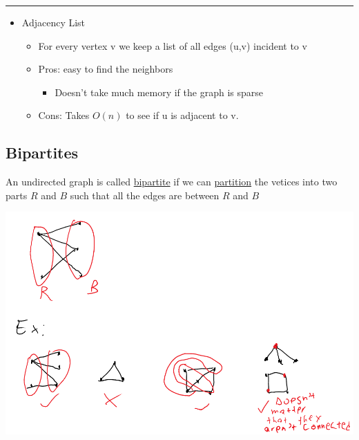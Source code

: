 \documentclass[11pt]{article}
\begin{document}
\noindent\rule{\textwidth}{0.5pt}
\begin{itemize}
\item Adjacency List
\begin{itemize}
\item For every vertex v we keep a list of all edges (u,v) incident to v
\item Pros: easy to find the neighbors
\begin{itemize}
\item Doesn't take much memory if the graph is sparse
\end{itemize}
\item Cons: Takes \(O(n)\) to see if u is adjacent to v.
\end{itemize}
\end{itemize}
\subsection{Bipartites}
\label{sec:orga78ffaa}
An undirected graph is called \uline{bipartite} if we can \uline{partition} the vetices into two parts \(R\) and \(B\) such that all the edges are between \(R\) and \(B\)
\begin{center}
\includegraphics[width=.9\linewidth]{./Images/i19.png}
\end{center}
\end{document}
